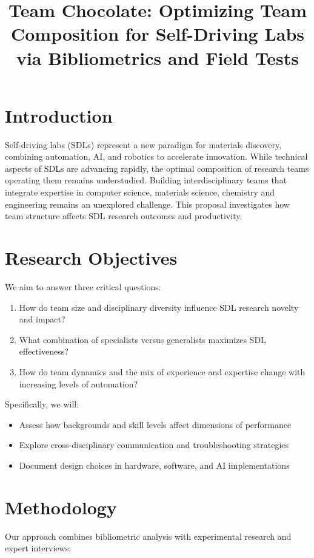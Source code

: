 \documentclass[11pt,letterpaper,twocolumn]{article}
\title{\textbf{Team Chocolate: Optimizing Team Composition for Self-Driving Labs via Bibliometrics and Field Tests}}
\author{}
\date{}
\begin{document}
\maketitle
\thispagestyle{plain}
\vspace{-3em} %

\section{Introduction}
Self-driving labs (SDLs) represent a new paradigm for materials discovery, combining automation, AI, and robotics to accelerate innovation\cite{sterling2024}. While technical aspects of SDLs are advancing rapidly, the optimal composition of research teams operating them remains understudied. Building interdisciplinary teams that integrate expertise in computer science, materials science, chemistry and engineering remains an unexplored challenge. This proposal investigates how team structure affects SDL research outcomes and productivity.

\section{Research Objectives}
We aim to answer three critical questions:
\begin{enumerate}
    \item How do team size and disciplinary diversity influence SDL research novelty and impact?
    \item What combination of specialists versus generalists maximizes SDL effectiveness?
    \item How do team dynamics and the mix of experience and expertise change with increasing levels of automation?
\end{enumerate}

Specifically, we will:
\begin{itemize}
    \item Assess how backgrounds and skill levels affect dimensions of performance
    \item Explore cross-disciplinary communication and troubleshooting strategies
    \item Document design choices in hardware, software, and AI implementations
\end{itemize}

\section{Methodology}
Our approach combines bibliometric analysis with experimental research and expert interviews:
\end{document}

